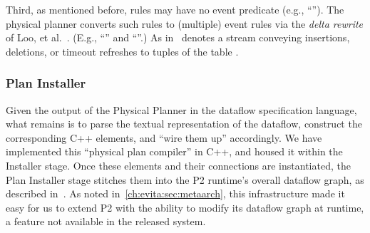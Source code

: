 
Third, as mentioned before, \OVERLOG rules may have no event predicate
(e.g., ``''). 
The physical planner converts such rules to (multiple) event rules via the {\em delta
rewrite} of Loo, et al.~\cite{loo-sigmod06}. (E.g., ``'' and ``''.) As in~\cite{loo-sigmod06}  denotes a stream conveying
insertions, deletions, or timeout refreshes to tuples of the table
.


\subsubsection{Plan Installer}
\label{ch:evita:sec:installer}

Given the output of the Physical Planner in the dataflow specification
language, what remains is to parse the
textual representation of the dataflow,  construct the
corresponding C++ elements, and ``wire them up'' accordingly. We have
implemented this 
``physical plan compiler'' in C++, and housed it within the
Installer stage.  Once these elements and their connections are
instantiated, the Plan Installer stage stitches them into the P2
runtime's overall dataflow graph, as described in~\cite{p2:sosp}.
As noted in~\ref{ch:evita:sec:metaarch}, this infrastructure made it easy for us to extend P2 with the ability to modify its dataflow graph at runtime,
a feature not available in the released system. 
% 

